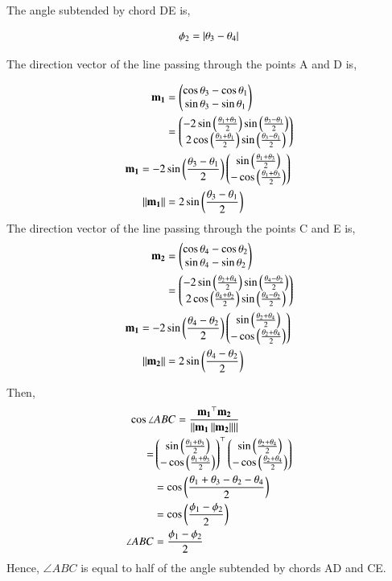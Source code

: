 \documentclass[journal,12pt,twocolumn]{IEEEtran}
\begin{document}
\begin{enumerate}
The angle subtended by chord DE is,

		\begin{align}
			\phi_2 = \left\vert\theta_3-\theta_4\right\vert
		\end{align}

The direction vector of the line passing through the points A and D is,

		\begin{align}
			\mathbf{m_1}&=\begin{pmatrix}\cos \theta_3-\cos \theta_1 \\ \sin \theta_3-\sin \theta_1\end{pmatrix}\\
			       &=\begin{pmatrix}-2\sin \left(\frac{\theta_1+\theta_3}{2}\right)\sin \left(\frac{\theta_3-\theta_1}{2}\right) \\ 2\cos \left(\frac{\theta_3+\theta_1}{2}\right) \sin \left(\frac{\theta_3-\theta_1}{2}\right)\end{pmatrix}\\
			\mathbf{m_1} = -2&\sin \left(\frac{\theta_3-\theta_1}{2}\right)\begin{pmatrix}\sin \left(\frac{\theta_1+\theta_3}{2}\right)\\-\cos \left(\frac{\theta_1+\theta_3}{2}\right)\end{pmatrix}\\ 
		\left\lVert\mathbf{m_1}\right\rVert &= 2\sin \left(\frac{\theta_3-\theta_1}{2}\right)
		\end{align}
The direction vector of the line passing through the points C and E is,
		\begin{align}
			\mathbf{m_2}&=\begin{pmatrix}\cos \theta_4-\cos \theta_2 \\ \sin \theta_4-\sin \theta_2\end{pmatrix}\\
			       &=\begin{pmatrix}-2\sin \left(\frac{\theta_2+\theta_4}{2}\right)\sin \left(\frac{\theta_4-\theta_2}{2}\right) \\ 2\cos \left(\frac{\theta_4+\theta_2}{2}\right) \sin \left(\frac{\theta_4-\theta_2}{2}\right)\end{pmatrix}\\
			\mathbf{m_1} = -2&\sin \left(\frac{\theta_4-\theta_2}{2}\right)\begin{pmatrix}\sin \left(\frac{\theta_2+\theta_4}{2}\right)\\-\cos \left(\frac{\theta_2+\theta_4}{2}\right)\end{pmatrix}\\ 
			\left\lVert\mathbf{m_2}\right\rVert&= 2\sin \left(\frac{\theta_4-\theta_2}{2}\right)
		\end{align}

Then,
		\begin{align}
			\cos \angle &ABC = \frac{\mathbf{m_1}^{\top}\mathbf{m_2}}{\left\lVert\mathbf{m_1}\left\lVert\mathbf{m_2}\right\rVert\right\rVert}\\
					= &\begin{pmatrix}\sin \left(\frac{\theta_1+\theta_3}{2}\right) \\ -\cos \left(\frac{\theta_1+\theta_3}{2}\right)\end{pmatrix}^{\top} \begin{pmatrix}\sin \left(\frac{\theta_2+\theta_4}{2}\right) \\ -\cos \left(\frac{\theta_2+\theta_4}{2}\right) \end{pmatrix}\\								
					&= \cos \left(\frac{\theta_1+\theta_3-\theta_2-\theta_4}{2}\right)\\
					&= \cos \left(\frac{\phi_1-\phi_2}{2}\right)\\
			     \angle ABC &= \frac{\phi_1-\phi_2}{2}
		\end{align}	
Hence, $\angle ABC$ is equal to half of the angle subtended by chords AD and CE.


\end{enumerate}
\end{document}
